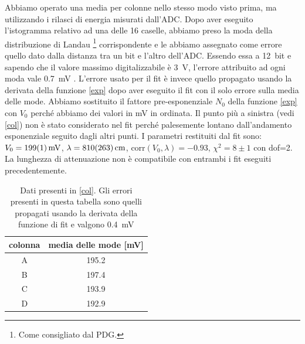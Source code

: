 Abbiamo operato una media per colonne nello stesso modo visto prima, ma utilizzando i rilasci di energia misurati dall'ADC. Dopo aver eseguito l'istogramma relativo ad una delle 16 caselle, abbiamo preso la moda della distribuzione di Landau%
\footnote{Come consigliato dal PDG.}
corrispondente e le abbiamo assegnato come errore quello dato dalla distanza tra un bit e l'altro dell'ADC. Essendo essa a \SI{12}{bit} e sapendo che il valore massimo digitalizzabile è \SI{3}{V}, l'errore attribuito ad ogni moda vale \SI{0.7}{mV}%
. 
L'errore usato per il fit è invece quello propagato usando la derivata della funzione \eqref{exp} dopo aver eseguito il fit con il solo errore sulla media delle mode.
Abbiamo sostituito il fattore pre-esponenziale $N_0$ della funzione \eqref{exp} con $V_0$ perché abbiamo dei valori in \si{mV} in ordinata. Il punto più a sinistra (vedi \autoref{col}) non è stato considerato nel fit perché palesemente lontano dall'andamento esponenziale seguito dagli altri punti.
I parametri restituiti dal fit sono: $V_0=\SI{199\pm1}{mV}$, $\lambda=\SI{810\pm263}{cm}$, corr$(V_0,\lambda)=-0.93$, $\chi^2=8\pm1$ con dof=2. La lunghezza di attenuazione non è compatibile con entrambi i fit eseguiti precedentemente.

\begin{table}[h]
\centering
\begin{tabular}{| c | c |}
\hline
colonna & media delle mode [mV] \\
\hline
A & 195.2\\
B & 197.4\\
C & 193.9\\
D & 192.9\\
\hline
\end{tabular}
\caption{Dati presenti in \autoref{col}. Gli errori presenti in questa tabella sono quelli propagati usando la derivata della funzione di fit e valgono \SI{0.4}{mV}}
\label{tab:ADC}
\end {table}

